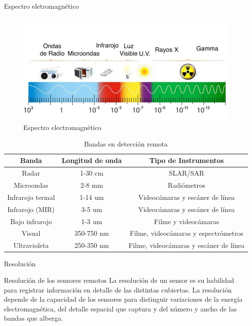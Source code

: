 \begin{frame}{Espectro eletromagnético}
    \begin{figure}
        \centering
        \includegraphics[scale=0.2]{img/section_03/espectro-electromagnetico.jpg}
        \caption{Espectro electromagnético}
        \label{fig:section_03_espectro_electromagnetico}
    \end{figure}
    
    \tiny
    \begin{table}
        \centering
        \begin{tabular}{c|c|c}
            \hline
            Banda & Longitud de onda & Tipo de Instrumentos \\
            \hline
            Radar & 1-30 cm & SLAR/SAR \\
            Microondas & 2-8 mm & Radiómetros \\
            Infrarojo termal & 1-14 um & Videocámaras y escáner de línea \\
            Infrarojo (MIR) & 3-5 um & Videocámaras y escáner de línea \\
            Bajo infrarojo & 1-3 um & Filme y videocámaras \\
            Visual & 350-750 nm & Filme, videocámaras y espectrómetros \\
            Ultravioleta & 250-350 nm & Filme, videocámaras y escáner de línea \\
            \hline
        \end{tabular}
        \caption{Bandas en detección remota}
        \label{tab:bandas_deteccion_remota}
    \end{table}
\end{frame}

\begin{frame}{Resolución}
    
  \begin{block}{Resolución de los sensores remotos}
    La resolución de un sensor es su habilidad para registrar información en detalle de las distintas cubiertas. La resolución depende de la capacidad de los sensores para distinguir variaciones de la energía electromagnética, del detalle espacial que captura y del número y ancho de las bandas que alberga.
  \end{block}
 \end{frame}
    
